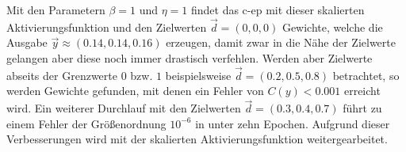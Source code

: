 Mit den Parametern \(\beta=1\) und \(\eta=1\) findet das \gls{c-ep} mit dieser skalierten Aktivierungsfunktion und den Zielwerten \(\vec{d}=(0,0,0)\) Gewichte, welche die Ausgabe \(\vec{y}\approx(0.14,0.14,0.16)\) erzeugen, damit zwar in die Nähe der Zielwerte gelangen aber diese noch immer drastisch verfehlen. Werden aber Zielwerte abseits der Grenzwerte \(0\) bzw. \(1\) beispielsweise \(\vec{d}=(0.2,0.5,0.8)\) betrachtet, so werden Gewichte gefunden, mit denen ein Fehler von \(C(y)<0.001\) erreicht wird. Ein weiterer Durchlauf mit den Zielwerten \(\vec{d}=(0.3,0.4,0.7)\) führt zu einem Fehler der Größenordnung \(10^{-6}\) in unter zehn Epochen. Aufgrund dieser Verbesserungen wird mit der skalierten Aktivierungsfunktion weitergearbeitet.

